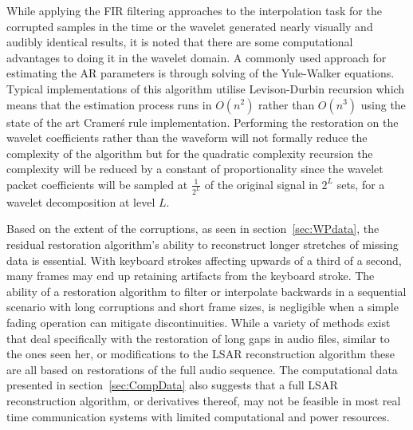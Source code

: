 While applying the FIR filtering approaches to the interpolation task for the corrupted samples in the time or the wavelet generated nearly visually and audibly identical results, it is noted that there are some computational advantages to doing it in the wavelet domain. A commonly used approach for estimating the AR parameters is through solving of the Yule-Walker equations. Typical implementations of this algorithm utilise Levison-Durbin recursion which means that the estimation process runs in $O(n^2)$\cite{Hayes1996} rather than $O(n^3)$ using the state of the art Cramer\'s rule implementation\cite{Habgood2012}. Performing the restoration on the wavelet coefficients rather than the waveform will not formally reduce the complexity of the algorithm but for the quadratic complexity recursion the complexity will be reduced by a constant of proportionality since the wavelet packet coefficients will be sampled at $\frac{1}{2^L}$ of the original signal in $2^L$ sets, for a wavelet decomposition at level $L$.

Based on the extent of the corruptions, as seen in section~\ref{sec:WPdata}, the residual restoration algorithm's ability to reconstruct longer stretches of missing data is essential. With keyboard strokes affecting upwards of a third of a second, many frames may end up retaining artifacts from the keyboard stroke. The ability of a restoration algorithm to filter or interpolate backwards in a sequential scenario with long corruptions and short frame sizes, is negligible when a simple fading operation can mitigate discontinuities. While a variety of methods exist that deal specifically with the restoration of long gaps in audio files, similar to the ones seen her, or modifications to the LSAR reconstruction algorithm\cite{Kauppinen2002a}\cite{Esquef2006} these are all based on restorations of the full audio sequence. The computational data presented in section~\ref{sec:CompData} also suggests that a full LSAR reconstruction algorithm, or derivatives thereof, may not be feasible in most real time communication systems with limited computational and power resources.




